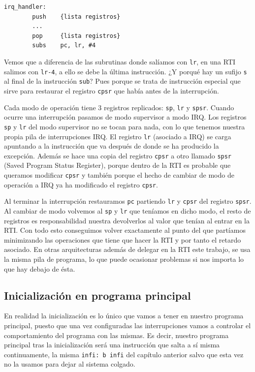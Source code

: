 \begin{lstlisting}
irq_handler:
        push    {lista registros}
        ...
        pop     {lista registros}
        subs    pc, lr, #4
\end{lstlisting}

Vemos que a diferencia de las subrutinas donde salíamos con {\tt lr}, en una RTI salimos
con {\tt lr-4}, a ello se debe la última instrucción. ¿Y porqué hay un sufijo {\tt s} al final
de la instrucción {\tt sub}? Pues porque se trata de instrucción especial que sirve para
restaurar el registro {\tt cpsr} que había antes de la interrupción.

Cada modo de operación tiene 3 registros replicados: {\tt sp}, {\tt lr} y {\tt spsr}. Cuando
ocurre una interrupción pasamos de modo supervisor a modo IRQ. Los registros {\tt sp}
y {\tt lr} del modo supervisor no se tocan para nada, con lo que tenemos nuestra propia pila
de interrupciones IRQ. El registro {\tt lr} (asociado a IRQ) se carga apuntando a la
instrucción que va después de donde se ha producido la excepción. Además se hace una copia
del registro {\tt cpsr} a otro llamado {\tt spsr} (Saved Program Status Register), porque
dentro de la RTI es probable que queramos modificar {\tt cpsr} y también porque el hecho
de cambiar de modo de operación a IRQ ya ha modificado el registro {\tt cpsr}.

Al terminar la interrupción restauramos {\tt pc} partiendo {\tt lr} y {\tt cpsr} del registro
{\tt spsr}. Al cambiar de modo volvemos al {\tt sp} y {\tt lr} que teníamos en dicho modo,
el resto de registros es responsabilidad nuestra devolverlos al valor que tenían al entrar
en la RTI. Con todo esto conseguimos volver exactamente al punto del que partíamos minimizando las
operaciones que tiene que hacer la RTI y por tanto el retardo asociado. En otras arquitecturas
además de delegar en la RTI este trabajo, se usa la misma pila de programa, lo que puede
ocasionar problemas si nos importa lo que hay debajo de ésta.

\subsection{Inicialización en programa principal}

En realidad la inicialización es lo único que vamos a tener en nuestro programa principal,
puesto que una vez configuradas las interrupciones vamos a controlar el comportamiento del
programa con las mismas. Es decir, nuestro programa principal tras la inicialización será una
instrucción que salta a sí misma continuamente, la misma {\tt infi: b infi} del capítulo
anterior salvo que esta vez no la usamos para dejar al sistema colgado.

